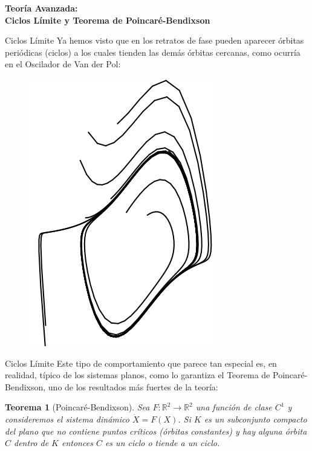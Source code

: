 \documentclass{beamer}
\newtheorem{teo}{Teorema}
\renewenvironment{theorem}{\begin{teo}}{\end{teo}}
\newcommand{\R}{{\ensuremath{\mathbb{R}}}}
\newcommand{\stframe}[1]{\begin{frame} \begin{center}\Large{\textbf{{#1}}}\end{center}\end{frame}}
\begin{document}
\stframe{Teoría Avanzada:\\ Ciclos Límite y Teorema de Poincaré-Bendixson}

\begin{frame}{Ciclos Límite}
Ya hemos visto que en los retratos de fase pueden aparecer órbitas periódicas (ciclos) a los cuales tienden las demás órbitas cercanas, como ocurría en el Oscilador de Van der Pol:

\begin{figure}[!ht] \centering
	\includegraphics[scale=0.35]{../figures/vanderpol.png}
\end{figure}
\end{frame}

\begin{frame}{Ciclos Límite}
Este tipo de comportamiento que parece tan especial es, en realidad, típico de los sistemas planos, como lo garantiza el Teorema de Poincaré-Bendixson, uno de los resultados más fuertes de la teoría:

\begin{theorem}[Poincaré-Bendixson] Sea $F: \R^2 \to \R^2$ una función de clase $C^1$ y consideremos el sistema dinámico $\dot{X} = F(X)$.
Si $K$ es un subconjunto compacto del plano que no contiene puntos críticos (órbitas constantes) y hay alguna órbita $C$ dentro de $K$ entonces $C$ es un ciclo o tiende a un ciclo.
\end{theorem}
\end{frame}
\end{document}

